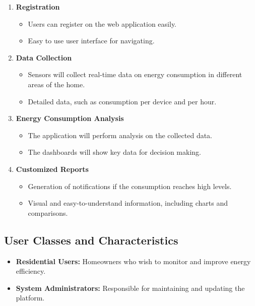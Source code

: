 \documentclass[conference]{IEEEtran}
\begin{document}
\begin{enumerate}
  \item \textbf{Registration}
     \begin{itemize}
        \item Users can register on the web application easily.
        \item Easy to use user interface for navigating.
     \end{itemize}

  \item \textbf{Data Collection}
     \begin{itemize}
        \item Sensors will collect real-time data on energy consumption in different areas of the home.
        \item Detailed data, such as consumption per device and per hour.
     \end{itemize}

  \item \textbf{Energy Consumption Analysis}
     \begin{itemize}
        \item The application will perform analysis on the collected data.
        \item The dashboards will show key data for decision making.
     \end{itemize}

  \item \textbf{Customized Reports}
     \begin{itemize}
        \item Generation of notifications if the consumption reaches high levels.
        \item Visual and easy-to-understand information, including charts and comparisons.
     \end{itemize}
\end{enumerate}

\subsection{User Classes and Characteristics}

\begin{itemize}
    \item \textbf{Residential Users:} Homeowners who wish to monitor and improve energy efficiency.
    \item \textbf{System Administrators:} Responsible for maintaining and updating the platform.
\end{itemize}
\end{document}
